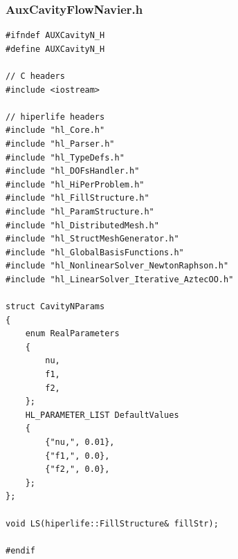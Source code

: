 \documentclass[]{article}
\begin{document}
\subsubsection{AuxCavityFlowNavier.h} \label{sec: a.h}
\begin{lstlisting}
#ifndef AUXCavityN_H
#define AUXCavityN_H

// C headers
#include <iostream>

// hiperlife headers
#include "hl_Core.h"
#include "hl_Parser.h"
#include "hl_TypeDefs.h"  
#include "hl_DOFsHandler.h"
#include "hl_HiPerProblem.h"
#include "hl_FillStructure.h"
#include "hl_ParamStructure.h"
#include "hl_DistributedMesh.h" 
#include "hl_StructMeshGenerator.h" 
#include "hl_GlobalBasisFunctions.h"
#include "hl_NonlinearSolver_NewtonRaphson.h"
#include "hl_LinearSolver_Iterative_AztecOO.h"

struct CavityNParams
{
	enum RealParameters
	{
		nu,
		f1,
		f2,
	};
	HL_PARAMETER_LIST DefaultValues
	{
		{"nu,", 0.01},
		{"f1,", 0.0},
		{"f2,", 0.0},
	};
};

void LS(hiperlife::FillStructure& fillStr);

#endif

\end{lstlisting}
\end{document}
